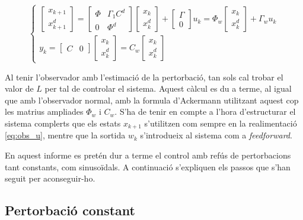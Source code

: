 \documentclass[12pt,a4paper,final,twoside,openright]{report}
\begin{document}
\begin{equation}\label{eq:pert_model_mat}
\left\{
\begin{array}{lr}
\begin{bmatrix}
x_{k+1}\\
x^d_{k+1}
\end{bmatrix} = 
\begin{bmatrix}
\Phi & \Gamma_1 C^d\\
0 & \Phi^d
\end{bmatrix} \begin{bmatrix}
x_{k}\\
x^d_{k}
\end{bmatrix} + 
\begin{bmatrix}
\Gamma\\
0
\end{bmatrix} u_k = \Phi_w \begin{bmatrix}
x_{k}\\
x^d_{k}
\end{bmatrix} + \Gamma_w u_k\\
y_k=\begin{bmatrix}
C & 0
\end{bmatrix} \begin{bmatrix}
x_{k}\\
x^d_{k}
\end{bmatrix} = C_w \begin{bmatrix}
x_{k}\\
x^d_{k}
\end{bmatrix}
\end{array}
\right.
\end{equation}

Al tenir l'observador amb l'estimació de la pertorbació, tan sols cal trobar el valor de $L$ per tal de controlar el sistema. Aquest càlcul es du a terme, al igual que amb l'observador normal, amb la formula d'Ackermann utilitzant aquest cop les matrius ampliades $\Phi_w$ i $C_w$. S'ha de tenir en compte a l'hora d'estructurar el sistema complerts que els estats $x_{k+1}$ s'utilitzen com sempre en la realimentació \eqref{eq:obs_u}, mentre que la sortida $w_k$ s'introdueix al sistema com a \textit{feedforward}.

En aquest informe es pretén dur a terme el control amb refús de pertorbacions tant constants, com sinusoïdals. A continuació s'expliquen els passos que s'han seguit per aconseguir-ho.

\subsection{Pertorbació constant}
\end{document}
